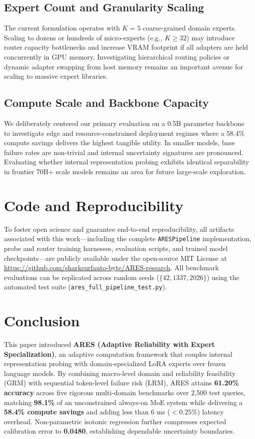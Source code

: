 \documentclass[journal,10pt,twocolumn]{IEEEtran}
\begin{document}
\subsection{Expert Count and Granularity Scaling}
The current formulation operates with $K=5$ coarse-grained domain experts. Scaling to dozens or hundreds of micro-experts (e.g., $K \ge 32$) may introduce router capacity bottlenecks and increase VRAM footprint if all adapters are held concurrently in GPU memory. Investigating hierarchical routing policies or dynamic adapter swapping from host memory remains an important avenue for scaling to massive expert libraries.

\subsection{Compute Scale and Backbone Capacity}
We deliberately centered our primary evaluation on a 0.5B parameter backbone to investigate edge and resource-constrained deployment regimes where a 58.4\% compute savings delivers the highest tangible utility. In smaller models, base failure rates are non-trivial and internal uncertainty signatures are pronounced. Evaluating whether internal representation probing exhibits identical separability in frontier 70B+ scale models remains an area for future large-scale exploration.

\section{Code and Reproducibility}
\label{sec:reproducibility}
To foster open science and guarantee end-to-end reproducibility, all artifacts associated with this work---including the complete \texttt{ARESPipeline} implementation, probe and router training harnesses, evaluation scripts, and trained model checkpoints---are publicly available under the open-source MIT License at \url{https://github.com/sharksurfauto-byte/ARES-research}. All benchmark evaluations can be replicated across random seeds ($\{42, 1337, 2026\}$) using the automated test suite (\texttt{ares\_full\_pipeline\_test.py}).

\section{Conclusion}

This paper introduced \textbf{ARES (Adaptive Reliability with Expert Specialization)}, an adaptive computation framework that couples internal representation probing with domain-specialized LoRA experts over frozen language models. By combining macro-level domain and reliability feasibility (GRM) with sequential token-level failure risk (LRM), ARES attains \textbf{61.20\% accuracy} across five rigorous multi-domain benchmarks over 2,500 test queries, matching \textbf{98.1\%} of an unconstrained always-on MoE system while delivering a \textbf{58.4\% compute savings} and adding less than 6 ms ($< 0.25\%$) latency overhead. Non-parametric isotonic regression further compresses expected calibration error to \textbf{0.0480}, establishing dependable uncertainty boundaries.
\end{document}
